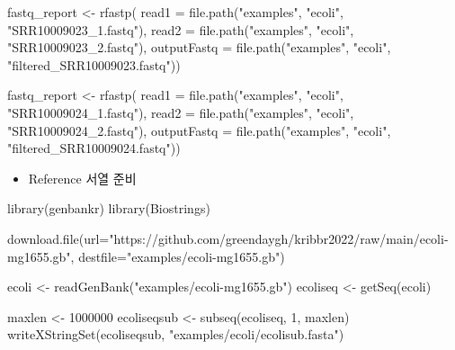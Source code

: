 \documentclass[
]{book}
\newenvironment{Shaded}{\begin{snugshade}}{\end{snugshade}}
\newcommand{\AttributeTok}[1]{\textcolor[rgb]{0.77,0.63,0.00}{#1}}
\newcommand{\DecValTok}[1]{\textcolor[rgb]{0.00,0.00,0.81}{#1}}
\newcommand{\FunctionTok}[1]{\textcolor[rgb]{0.00,0.00,0.00}{#1}}
\newcommand{\NormalTok}[1]{#1}
\newcommand{\OtherTok}[1]{\textcolor[rgb]{0.56,0.35,0.01}{#1}}
\newcommand{\StringTok}[1]{\textcolor[rgb]{0.31,0.60,0.02}{#1}}
\providecommand{\tightlist}{%
  \setlength{\itemsep}{0pt}\setlength{\parskip}{0pt}}
\begin{document}
\begin{Shaded}
\begin{Highlighting}[]
\NormalTok{fastq\_report }\OtherTok{\textless{}{-}} \FunctionTok{rfastp}\NormalTok{(}
  \AttributeTok{read1 =} \FunctionTok{file.path}\NormalTok{(}\StringTok{"examples"}\NormalTok{, }\StringTok{"ecoli"}\NormalTok{, }\StringTok{"SRR10009023\_1.fastq"}\NormalTok{),}
  \AttributeTok{read2 =} \FunctionTok{file.path}\NormalTok{(}\StringTok{"examples"}\NormalTok{, }\StringTok{"ecoli"}\NormalTok{, }\StringTok{"SRR10009023\_2.fastq"}\NormalTok{), }
  \AttributeTok{outputFastq =} \FunctionTok{file.path}\NormalTok{(}\StringTok{"examples"}\NormalTok{, }\StringTok{"ecoli"}\NormalTok{, }\StringTok{"filtered\_SRR10009023.fastq"}\NormalTok{))}

\NormalTok{fastq\_report }\OtherTok{\textless{}{-}} \FunctionTok{rfastp}\NormalTok{(}
  \AttributeTok{read1 =} \FunctionTok{file.path}\NormalTok{(}\StringTok{"examples"}\NormalTok{, }\StringTok{"ecoli"}\NormalTok{, }\StringTok{"SRR10009024\_1.fastq"}\NormalTok{),}
  \AttributeTok{read2 =} \FunctionTok{file.path}\NormalTok{(}\StringTok{"examples"}\NormalTok{, }\StringTok{"ecoli"}\NormalTok{, }\StringTok{"SRR10009024\_2.fastq"}\NormalTok{), }
  \AttributeTok{outputFastq =} \FunctionTok{file.path}\NormalTok{(}\StringTok{"examples"}\NormalTok{, }\StringTok{"ecoli"}\NormalTok{, }\StringTok{"filtered\_SRR10009024.fastq"}\NormalTok{))}
\end{Highlighting}
\end{Shaded}

\begin{itemize}
\tightlist
\item
  Reference 서열 준비
\end{itemize}

\begin{Shaded}
\begin{Highlighting}[]
\FunctionTok{library}\NormalTok{(genbankr)}
\FunctionTok{library}\NormalTok{(Biostrings)}

\FunctionTok{download.file}\NormalTok{(}\AttributeTok{url=}\StringTok{"https://github.com/greendaygh/kribbr2022/raw/main/ecoli{-}mg1655.gb"}\NormalTok{, }\AttributeTok{destfile=}\StringTok{"examples/ecoli{-}mg1655.gb"}\NormalTok{)}

\NormalTok{ecoli }\OtherTok{\textless{}{-}} \FunctionTok{readGenBank}\NormalTok{(}\StringTok{"examples/ecoli{-}mg1655.gb"}\NormalTok{)}
\NormalTok{ecoliseq }\OtherTok{\textless{}{-}} \FunctionTok{getSeq}\NormalTok{(ecoli)}


\NormalTok{maxlen }\OtherTok{\textless{}{-}} \DecValTok{1000000}
\NormalTok{ecoliseqsub }\OtherTok{\textless{}{-}} \FunctionTok{subseq}\NormalTok{(ecoliseq, }\DecValTok{1}\NormalTok{, maxlen)}
\FunctionTok{writeXStringSet}\NormalTok{(ecoliseqsub, }\StringTok{"examples/ecoli/ecolisub.fasta"}\NormalTok{)}
\end{Highlighting}
\end{Shaded}
\end{document}
